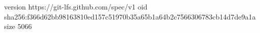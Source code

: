 version https://git-lfs.github.com/spec/v1
oid sha256:f366d62bb98163810ed157c51970b35a65b1a64b2c7566306783cb14d7de9a1a
size 5066
